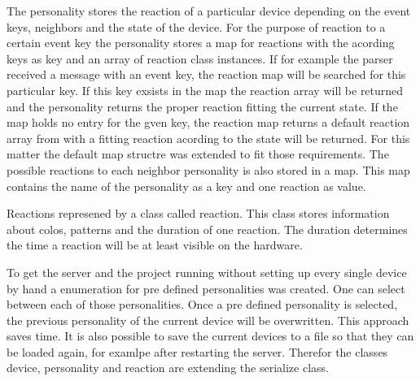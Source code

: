 The personality stores the reaction of a particular device depending on the
event keys, neighbors and the state of the device. For the purpose of reaction
to a certain event key the personality stores
a map for reactions with the acording keys as key and an array of reaction class
instances. If for example the parser received a message with an event key, the
reaction map will be searched for this particular key. If this key exsists in
the map the reaction array will be returned and the personality returns the
proper reaction fitting the current state. If the map holds no entry for the
gven key, the reaction map returns a default reaction array from with a fitting
reaction acording to the state will be returned. For this matter the default
map structre was extended to fit those requirements.
The possible reactions to each neighbor personality is also stored in a map. This
map contains the name of the personality as a key and one reaction as value. 

Reactions represened by a class called reaction. This class stores information
about colos, patterns and the duration of one reaction. The duration determines
the time a reaction will be at least visible on the hardware.

To get the server and the project running without setting up every single device
by hand a enumeration for pre defined personalities was created. One can select
between each of those personalities. Once a pre defined personality is selected,
the previous personality of the current device will be overwritten. This
approach saves time. It is also possible to save the current devices to a file
so that they can be loaded again, for examlpe after restarting the server.
Therefor the classes device, personality and reaction are extending the
serialize class.

